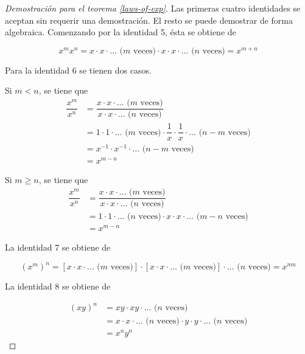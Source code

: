 \begin{proof}[Demostración para el teorema \ref{laws-of-exp}]
    Las primeras cuatro identidades se aceptan sin requerir una demostración.
    El resto se puede demostrar de forma algebraica. Comenzando por la
    identidad 5, ésta se obtiene de
    
    \[
    x^{m}x^{n}=x\cdot x\cdot\dots\text{ (}m\text{ veces)}\cdot x\cdot x\cdot\dots\text{ (}n\text{ veces)}=x^{m+n}
    \]
    
    Para la identidad 6 se tienen dos casos.
    \begin{casenv}
        \item Si $m<n$, se tiene que
        \begin{align*}
            \dfrac{x^{m}}{x^{n}} &= \dfrac{x\cdot x\cdot\dots\text{ (}m\text{ veces)}}{x\cdot x\cdot\dots\text{ (}n\text{ veces)}}\\
            &= 1\cdot1\cdot\dots\text{ (}m\text{ veces)}\cdot\dfrac{1}{x}\cdot\dfrac{1}{x}\cdot\dots\text{ (}n-m\text{ veces)}\\
            &= x^{-1}\cdot x^{-1}\cdot\dots\text{ (}n-m\text{ veces)}\\
            &= x^{m-n}
        \end{align*}
        \item Si $m\geq n$, se tiene que
        \begin{align*}
            \dfrac{x^{m}}{x^{n}} &= \dfrac{x\cdot x\cdot\dots\text{ (}m\text{ veces)}}{x\cdot x\cdot\dots\text{ (}n\text{ veces)}}\\
            &= 1\cdot1\cdot\dots\text{ (}n\text{ veces)}\cdot x\cdot x\cdot\dots\text{ (}m-n\text{ veces)}\\
            &= x^{m-n}
        \end{align*}
    \end{casenv}
    
    La identidad 7 se obtiene de
    
    \[
    \left(x^{m}\right)^{n}=\left[x\cdot x\cdot\dots\text{ (}m\text{ veces)}\right]\cdot\left[x\cdot x\cdot\dots\text{ (}m\text{ veces)}\right]\cdot\dots\text{ (}n\text{ veces)}=x^{mn}
    \]
    
    La identidad 8 se obtiene de
    
    \begin{align*}
        \left(xy\right)^{n} &=xy\cdot xy\cdot\dots\text{ (}n\text{ veces)}\\
        &= x\cdot x\cdot\dots\text{ (}n\text{ veces)}\cdot y\cdot y\cdot\dots\text{ (}n\text{ veces)}\\
        &= x^{n}y^{n}
    \end{align*}
    

\end{proof}

